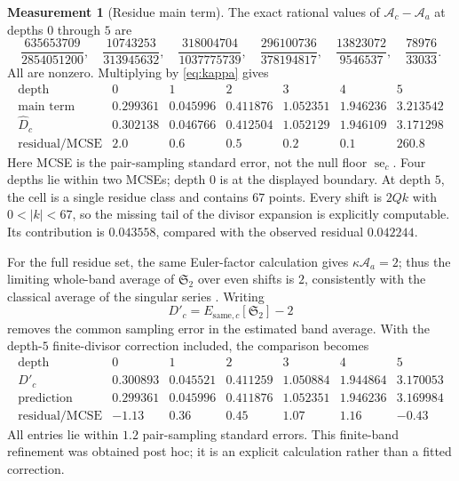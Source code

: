 \documentclass[11pt,a4paper]{article}
\theoremstyle{plain}
\theoremstyle{definition}
\newtheorem{measurement}[theorem]{Measurement}
\theoremstyle{remark}
\renewcommand{\SS}{\mathfrak{S}}
\newcommand{\widehatD}{\widehat D}
\begin{document}
\begin{measurement}[Residue main term]\label{meas:maincoef}
The exact rational values of $\mathcal A_c-\mathcal A_a$ at depths
$0$ through $5$ are
\[
 \frac{635653709}{2854051200},\quad
 \frac{10743253}{313945632},\quad
 \frac{318004704}{1037775739},\quad
 \frac{296100736}{378194817},\quad
 \frac{13823072}{9546537},\quad
 \frac{78976}{33033}.
\]
All are nonzero.  Multiplying by \eqref{eq:kappa} gives
\[
\begin{array}{r|cccccc}
 \text{depth}&0&1&2&3&4&5\\\hline
 \text{main term}&0.299361&0.045996&0.411876&1.052351&1.946236&3.213542\\
 \widehatD_c&0.302138&0.046766&0.412504&1.052129&1.946109&3.171298\\
 \text{residual/MCSE}&2.0&0.6&0.5&0.2&0.1&260.8
\end{array}
\]
Here MCSE is the pair-sampling standard error, not the null floor
$\operatorname{se}_c$.  Four depths lie within two MCSEs; depth $0$ is
at the displayed boundary.  At depth $5$, the cell is a single residue
class and contains $67$ points.  Every shift is $2Qk$ with
$0<|k|<67$, so the missing tail of the divisor expansion is explicitly
computable.  Its contribution is $0.043558$, compared with the observed
residual $0.042244$.

For the full residue set, the same Euler-factor calculation gives
$\kappa\mathcal A_a=2$; thus the limiting whole-band average of
$\SS_2$ over even shifts is $2$, consistently with the classical
average of the singular series \cite{Gallagher,Pintz}.
Writing
\[
 D'_c=E_{\mathrm{same},c}[\SS_2]-2
\]
removes the common sampling error in the estimated band average.  With
the depth-$5$ finite-divisor correction included, the comparison becomes
\[
\begin{array}{r|cccccc}
 \text{depth}&0&1&2&3&4&5\\\hline
 D'_c&0.300893&0.045521&0.411259&1.050884&1.944864&3.170053\\
 \text{prediction}&0.299361&0.045996&0.411876&1.052351&1.946236&3.169984\\
 \text{residual/MCSE}&-1.13&0.36&0.45&1.07&1.16&-0.43
\end{array}
\]
All entries lie within $1.2$ pair-sampling standard errors.  This
finite-band refinement was obtained post hoc; it is an explicit
calculation rather than a fitted correction.
\end{measurement}
\end{document}

